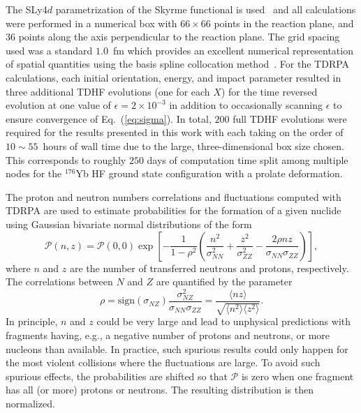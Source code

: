 \documentclass[reprint,aps,prc,twocolumn,superscriptaddress,floatfix,10pt]{revtex4-2}
\begin{document}
The SLy4$d$ parametrization of the Skyrme functional is used~\cite{kim1997} and
all calculations were performed in a numerical box with $66 \times 66$ points in the reaction plane, and 36 points along the axis perpendicular to the reaction plane.
The grid spacing used was a standard $1.0$~fm which provides an excellent numerical representation of spatial quantities using the basis spline collocation method~\cite{umar1991a}.
For the TDRPA calculations, each initial orientation, energy, and impact parameter resulted in three additional TDHF evolutions (one for each $X$) for the time reversed evolution at one value of $\epsilon=2\times10^{-3}$ in addition to occasionally scanning $\epsilon$ to ensure convergence of Eq.~(\ref{eq:sigma}).
In total, $200$ full TDHF evolutions were required for the results presented in this work with each taking on the order of $10\sim55$~hours of wall time due to the large, three-dimensional box size chosen.
This corresponds to roughly $250$ days of computation time split among multiple nodes for the $^{176}$Yb HF ground state configuration with a prolate deformation. 

The proton and neutron numbers correlations and fluctuations computed with TDRPA are used to estimate probabilities for the formation of a given nuclide using 
 Gaussian bivariate normal  distributions of the form
\begin{equation}
\mathcal{P}(n,z) = \mathcal{P}(0,0)\exp\left[ -\frac{1}{1-\rho^2} \left( \frac{n^2}{\sigma_{NN}^2}+\frac{z^2}{\sigma_{ZZ}^2} - \frac{2\rho nz}{\sigma_{NN}\sigma_{ZZ}}\right) \right], 
\label{eq:Pnz}
\end{equation}
where $n$ and $z$ are the number of transferred neutrons and protons, respectively.  
The correlations between $N$ and $Z$ are quantified by the parameter
\begin{equation}
\rho = \mbox{sign}(\sigma_{NZ})\frac{\sigma_{NZ}^2}{\sigma_{NN}\sigma_{ZZ}}=\frac{\langle nz\rangle}{\sqrt{\langle n^2\rangle\langle z^2\rangle}}.
\end{equation}
In principle, $n$ and $z$ could be very large and lead to unphysical predictions with fragments having, e.g., a negative number of protons and neutrons, or more nucleons than available. 
In practice, such spurious results could only happen for the most violent collisions where the fluctuations are large.  
To avoid such spurious effects, the probabilities are shifted so that $\mathcal{P}$ is zero when one fragment has all (or more) protons or neutrons. 
The resulting distribution is then normalized. 
\end{document}
